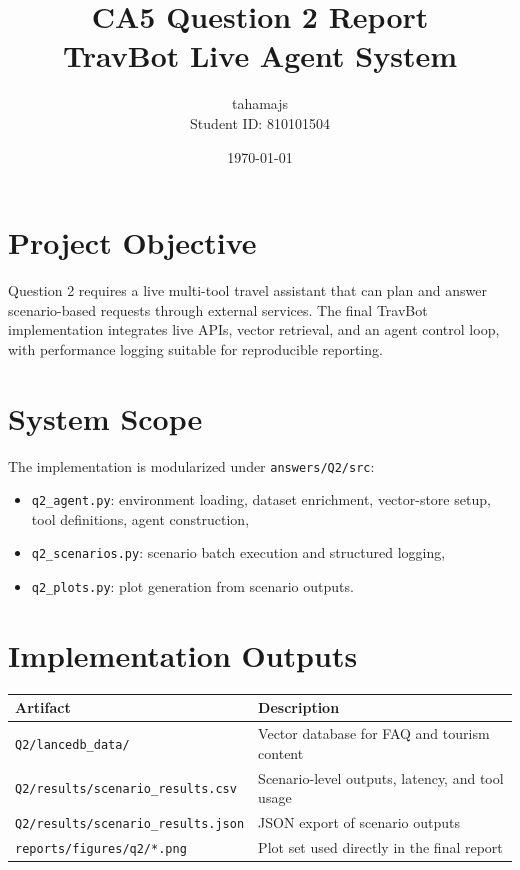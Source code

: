 \documentclass[12pt,a4paper]{article}
\title{CA5 Question 2 Report\\TravBot Live Agent System}
\author{tahamajs\\Student ID: 810101504}
\date{\today}
\begin{document}
\maketitle

\section{Project Objective}
Question 2 requires a live multi-tool travel assistant that can plan and answer scenario-based requests through external services. The final TravBot implementation integrates live APIs, vector retrieval, and an agent control loop, with performance logging suitable for reproducible reporting.

\section{System Scope}
The implementation is modularized under \texttt{answers/Q2/src}:
\begin{itemize}
\item \texttt{q2\_agent.py}: environment loading, dataset enrichment, vector-store setup, tool definitions, agent construction,
\item \texttt{q2\_scenarios.py}: scenario batch execution and structured logging,
\item \texttt{q2\_plots.py}: plot generation from scenario outputs.
\end{itemize}

\section{Implementation Outputs}
\begin{longtable}{@{}>{\raggedright\arraybackslash}p{} >{\raggedright\arraybackslash}p{}@{}}
\toprule
Artifact & Description \\
\midrule
\texttt{Q2/lancedb\_data/} & Vector database for FAQ and tourism content \\
\texttt{Q2/results/scenario\_results.csv} & Scenario-level outputs, latency, and tool usage \\
\texttt{Q2/results/scenario\_results.json} & JSON export of scenario outputs \\
\texttt{reports/figures/q2/*.png} & Plot set used directly in the final report \\
\bottomrule
\end{longtable}
\end{document}
